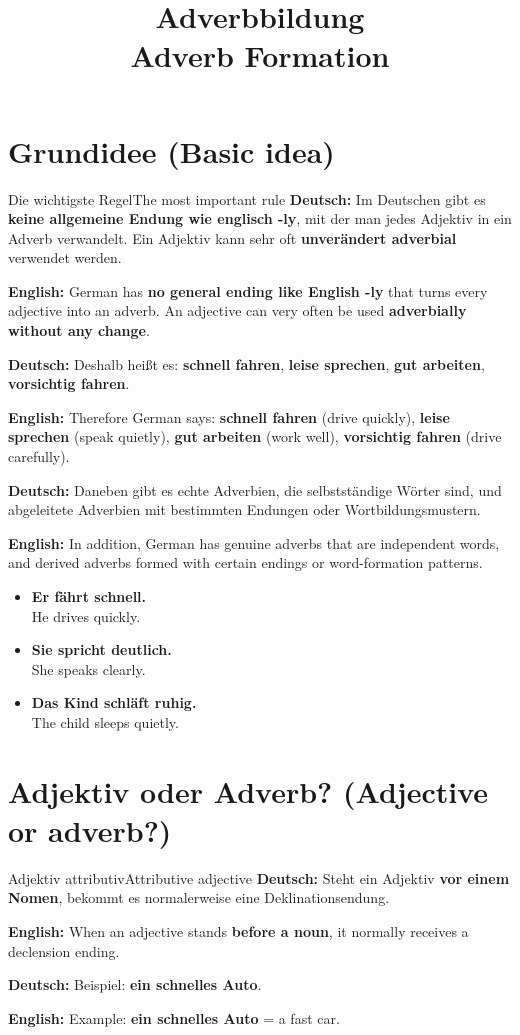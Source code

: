 \documentclass[a4paper,11pt]{article}
\title{Adverbbildung\\\large \textnormal{Adverb Formation}}
\date{}
\newcommand{\GermanText}[1]{\textbf{Deutsch: }#1\par}
\newcommand{\EnglishText}[1]{{\small\color{SoftGray}\textbf{English: }#1\par}}
\newcommand{\ExampleItem}[2]{\item \textbf{#1}\\{\small\color{SoftGray}#2}}
\newcommand{\BSection}[2]{\section{#1 \textnormal{\small (#2)}}}
\begin{document}
\maketitle
\tableofcontents
\newpage

\BSection{Grundidee}{Basic idea}

\begin{grammarentry}{Die wichtigste Regel}{The most important rule}
\GermanText{Im Deutschen gibt es \textbf{keine allgemeine Endung wie englisch -ly}, mit der man jedes Adjektiv in ein Adverb verwandelt. Ein Adjektiv kann sehr oft \textbf{unverändert adverbial} verwendet werden.}
\EnglishText{German has \textbf{no general ending like English -ly} that turns every adjective into an adverb. An adjective can very often be used \textbf{adverbially without any change}.}

\GermanText{Deshalb heißt es: \textbf{schnell fahren}, \textbf{leise sprechen}, \textbf{gut arbeiten}, \textbf{vorsichtig fahren}.}
\EnglishText{Therefore German says: \textbf{schnell fahren} (drive quickly), \textbf{leise sprechen} (speak quietly), \textbf{gut arbeiten} (work well), \textbf{vorsichtig fahren} (drive carefully).}

\GermanText{Daneben gibt es echte Adverbien, die selbstständige Wörter sind, und abgeleitete Adverbien mit bestimmten Endungen oder Wortbildungsmustern.}
\EnglishText{In addition, German has genuine adverbs that are independent words, and derived adverbs formed with certain endings or word-formation patterns.}
\end{grammarentry}

\begin{exbox}
\begin{itemize}
\ExampleItem{Er fährt schnell.}{He drives quickly.}
\ExampleItem{Sie spricht deutlich.}{She speaks clearly.}
\ExampleItem{Das Kind schläft ruhig.}{The child sleeps quietly.}
\end{itemize}
\end{exbox}

\BSection{Adjektiv oder Adverb?}{Adjective or adverb?}

\begin{grammarentry}{Adjektiv attributiv}{Attributive adjective}
\GermanText{Steht ein Adjektiv \textbf{vor einem Nomen}, bekommt es normalerweise eine Deklinationsendung.}
\EnglishText{When an adjective stands \textbf{before a noun}, it normally receives a declension ending.}
\GermanText{Beispiel: \textbf{ein schnelles Auto}.}
\EnglishText{Example: \textbf{ein schnelles Auto} = a fast car.}
\end{grammarentry}
\end{document}
